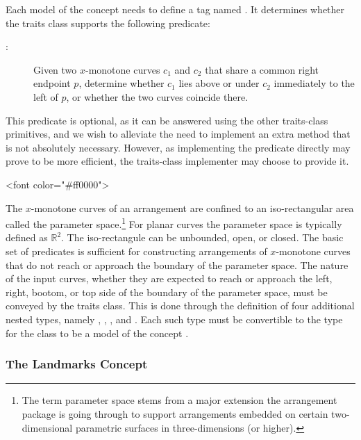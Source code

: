 Each model of the concept 
needs to define a tag named . It determines
whether the traits class supports the following predicate:
\begin{description}
\item[:]
  Given two $x$-monotone curves $c_1$ and $c_2$ that share a common
  right endpoint $p$, determine whether $c_1$ lies above or under
  $c_2$ immediately to the left of $p$, or whether the two curves
  coincide there.
\end{description}
This predicate is optional, as it can be answered using the
other traits-class primitives, and we wish to alleviate the
need to implement an extra method that is not absolutely
necessary. However, as implementing the predicate directly
may prove to be more efficient, the traits-class
implementer may choose to provide it.

\lcTex{\color{red}}
\begin{ccHtmlOnly}
<font color="#ff0000">
\end{ccHtmlOnly}
The $x$-monotone curves of an arrangement are confined to an
iso-rectangular area called the parameter space.\footnote{The term
  parameter space stems from a major extension the arrangement
  package is going through to support arrangements embedded on
  certain two-dimensional parametric surfaces in three-dimensions
  (or higher).} For planar curves the parameter space is typically
defined as $\mathbb{R}^2$. The iso-rectangule can be unbounded, open,
or closed. The basic set of predicates is sufficient for constructing
arrangements of $x$-monotone curves that do not reach or approach the
boundary of the parameter space. The nature of the input curves,
whether they are expected to reach or approach the left, right,
bootom, or top side of the boundary of the parameter space, must be
conveyed by the traits class. This is done through the definition of
four additional nested types, namely ,
, , and
. Each such type must be convertible to the
type  for the class to be a model of the
concept .
\lcTex{\color{black}}

\subsubsection{The Landmarks Concept
\label{arr_sssec:tr_lanmarks_concept}}

